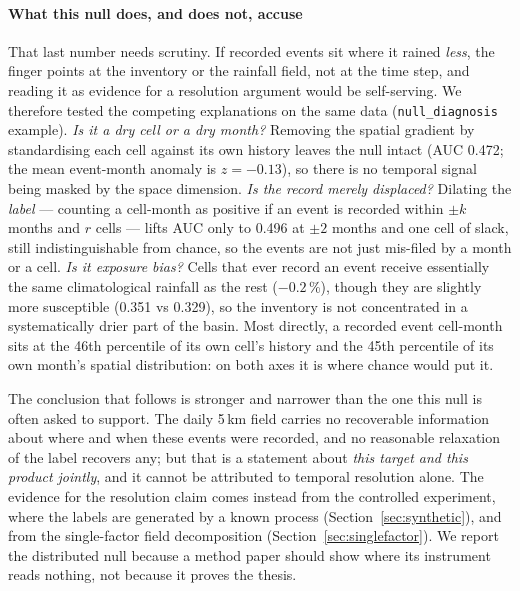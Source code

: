 \documentclass[authoryear,preprint,review,12pt]{elsarticle}
\begin{document}
\paragraph{What this null does, and does not, accuse}
That last number needs scrutiny. If recorded events sit where it rained \emph{less}, the finger points at the inventory or the rainfall field, not at the time step, and reading it as evidence for a resolution argument would be self-serving. We therefore tested the competing explanations
on the same data (\texttt{null\_diagnosis} example). \emph{Is it a dry cell or a dry
month?} Removing the spatial gradient by standardising each cell against its own
history leaves the null intact (AUC 0.472; the mean event-month anomaly is
$z=-0.13$), so there is no temporal signal being masked by the space dimension.
\emph{Is the record merely displaced?} Dilating the \emph{label} --- counting a
cell-month as positive if an event is recorded within $\pm k$ months and $r$ cells
--- lifts AUC only to 0.496 at $\pm2$ months and one cell of slack, still
indistinguishable from chance, so the events are not just mis-filed by a month or a cell. \emph{Is it exposure bias?} Cells that ever record an event receive
essentially the same climatological rainfall as the rest ($-0.2$\,\%), though they
are slightly more susceptible (0.351 vs 0.329), so the inventory is not
concentrated in a systematically drier part of the basin. Most directly, a recorded
event cell-month sits at the 46th percentile of its own cell's history and the 45th
percentile of its own month's spatial distribution: on both axes it is where chance
would put it.

The conclusion that follows is stronger and narrower than the one this null is often asked to support. The daily 5\,km field carries no recoverable information about
where and when these events were recorded, and no reasonable relaxation of the
label recovers any; but that is a statement about \emph{this target and this
product jointly}, and it cannot be attributed to temporal resolution alone. The
evidence for the resolution claim comes instead from the controlled experiment,
where the labels are generated by a known process (Section~\ref{sec:synthetic}),
and from the single-factor field decomposition
(Section~\ref{sec:singlefactor}). We report the distributed null because a method
paper should show where its instrument reads nothing, not because it proves the
thesis.
\end{document}
